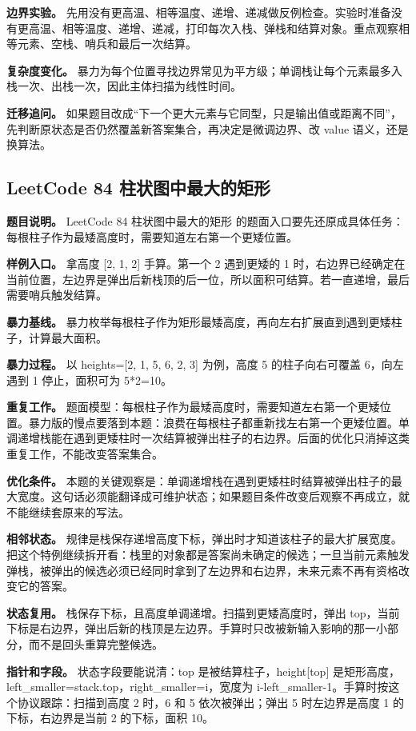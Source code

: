 \textbf{边界实验。} 先用没有更高温、相等温度、递增、递减做反例检查。实验时准备没有更高温、相等温度、递增、递减，打印每次入栈、弹栈和结算对象。重点观察相等元素、空栈、哨兵和最后一次结算。

\textbf{复杂度变化。} 暴力为每个位置寻找边界常见为平方级；单调栈让每个元素最多入栈一次、出栈一次，因此主体扫描为线性时间。

\textbf{迁移追问。} 如果题目改成“下一个更大元素与它同型，只是输出值或距离不同”，先判断原状态是否仍然覆盖新答案集合，再决定是微调边界、改 value 语义，还是换算法。

\subsection{LeetCode 84 柱状图中最大的矩形}

\textbf{题目说明。} LeetCode 84 柱状图中最大的矩形 的题面入口要先还原成具体任务：每根柱子作为最矮高度时，需要知道左右第一个更矮位置。

\textbf{样例入口。} 拿高度 [2, 1, 2] 手算。第一个 2 遇到更矮的 1 时，右边界已经确定在当前位置，左边界是弹出后新栈顶的后一位，所以面积可结算。若一直递增，最后需要哨兵触发结算。

\textbf{暴力基线。} 暴力枚举每根柱子作为矩形最矮高度，再向左右扩展直到遇到更矮柱子，计算最大面积。

\textbf{暴力过程。} 以 heights=[2, 1, 5, 6, 2, 3] 为例，高度 5 的柱子向右可覆盖 6，向左遇到 1 停止，面积可为 5*2=10。

\textbf{重复工作。} 题面模型：每根柱子作为最矮高度时，需要知道左右第一个更矮位置。暴力版的慢点要落到本题：浪费在每根柱子都重新找左右第一个更矮位置。单调递增栈能在遇到更矮柱时一次结算被弹出柱子的右边界。后面的优化只消掉这类重复工作，不能改变答案集合。

\textbf{优化条件。} 本题的关键观察是：单调递增栈在遇到更矮柱时结算被弹出柱子的最大宽度。这句话必须能翻译成可维护状态；如果题目条件改变后观察不再成立，就不能继续套原来的写法。

\textbf{相邻状态。} 规律是栈保存递增高度下标，弹出时才知道该柱子的最大扩展宽度。把这个特例继续拆开看：栈里的对象都是答案尚未确定的候选；一旦当前元素触发弹栈，被弹出的候选必须已经同时拿到了左边界和右边界，未来元素不再有资格改变它的答案。

\textbf{状态复用。} 栈保存下标，且高度单调递增。扫描到更矮高度时，弹出 top，当前下标是右边界，弹出后新的栈顶是左边界。手算时只改被新输入影响的那一小部分，而不是回头重算完整候选。

\textbf{指针和字段。} 状态字段要能说清：top 是被结算柱子，height[top] 是矩形高度，left\_smaller=stack.top，right\_smaller=i，宽度为 i-left\_smaller-1。手算时按这个协议跟踪：扫描到高度 2 时，6 和 5 依次被弹出；弹出 5 时左边界是高度 1 的下标，右边界是当前 2 的下标，面积 10。

